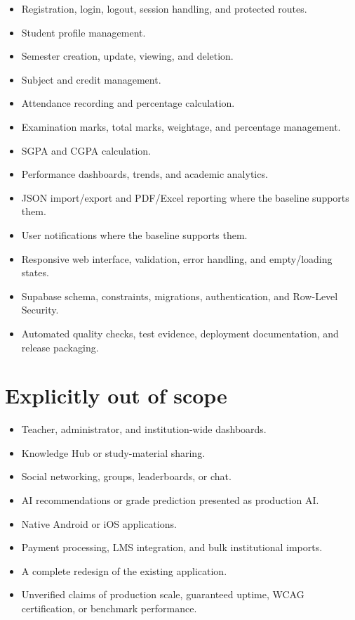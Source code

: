 \documentclass[
  10pt,
  a4paper,
  oneside]{report}
\providecommand{\tightlist}{%
  \setlength{\itemsep}{0pt}\setlength{\parskip}{0pt}}
\begin{document}
\begin{itemize}
\tightlist
\item
  Registration, login, logout, session handling, and protected routes.
\item
  Student profile management.
\item
  Semester creation, update, viewing, and deletion.
\item
  Subject and credit management.
\item
  Attendance recording and percentage calculation.
\item
  Examination marks, total marks, weightage, and percentage management.
\item
  SGPA and CGPA calculation.
\item
  Performance dashboards, trends, and academic analytics.
\item
  JSON import/export and PDF/Excel reporting where the baseline supports
  them.
\item
  User notifications where the baseline supports them.
\item
  Responsive web interface, validation, error handling, and
  empty/loading states.
\item
  Supabase schema, constraints, migrations, authentication, and
  Row-Level Security.
\item
  Automated quality checks, test evidence, deployment documentation, and
  release packaging.
\end{itemize}

\section{Explicitly out of scope}\label{46-explicitly-out-of-scope}

\begin{itemize}
\tightlist
\item
  Teacher, administrator, and institution-wide dashboards.
\item
  Knowledge Hub or study-material sharing.
\item
  Social networking, groups, leaderboards, or chat.
\item
  AI recommendations or grade prediction presented as production AI.
\item
  Native Android or iOS applications.
\item
  Payment processing, LMS integration, and bulk institutional imports.
\item
  A complete redesign of the existing application.
\item
  Unverified claims of production scale, guaranteed uptime, WCAG
  certification, or benchmark performance.
\end{itemize}
\end{document}
